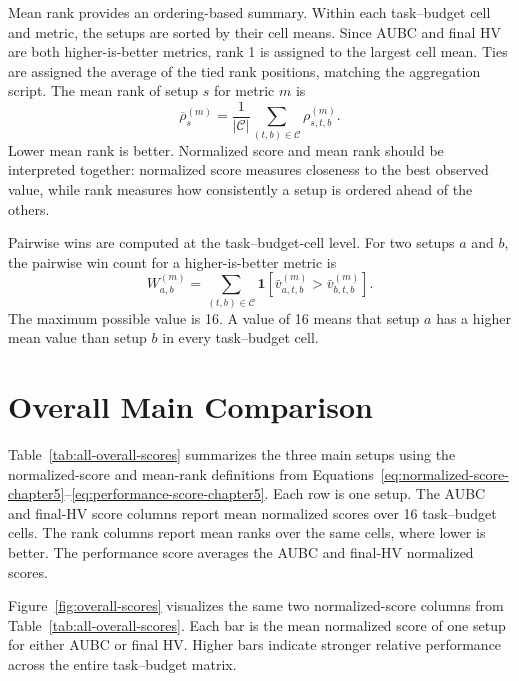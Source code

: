 Mean rank provides an ordering-based summary. Within each task--budget cell and metric, the setups are sorted by their cell means. Since AUBC and final HV are both higher-is-better metrics, rank 1 is assigned to the largest cell mean. Ties are assigned the average of the tied rank positions, matching the aggregation script. The mean rank of setup $s$ for metric $m$ is
\begin{equation}
  \overline{\rho}^{(m)}_{s}
  =
  \frac{1}{|\mathcal{C}|}
  \sum_{(t,b)\in\mathcal{C}}
  \rho^{(m)}_{s,t,b}.
  \label{eq:mean-rank-chapter5}
\end{equation}
Lower mean rank is better. Normalized score and mean rank should be interpreted together: normalized score measures closeness to the best observed value, while rank measures how consistently a setup is ordered ahead of the others.

Pairwise wins are computed at the task--budget-cell level. For two setups $a$ and $b$, the pairwise win count for a higher-is-better metric is
\begin{equation}
  W^{(m)}_{a,b}
  =
  \sum_{(t,b)\in\mathcal{C}}
  \mathbf{1}
  \left[
    \bar{v}^{(m)}_{a,t,b}
    >
    \bar{v}^{(m)}_{b,t,b}
  \right].
  \label{eq:pairwise-wins-chapter5}
\end{equation}
The maximum possible value is 16. A value of 16 means that setup $a$ has a higher mean value than setup $b$ in every task--budget cell.

\section{Overall Main Comparison}

Table~\ref{tab:all-overall-scores} summarizes the three main setups using the normalized-score and mean-rank definitions from Equations~\ref{eq:normalized-score-chapter5}--\ref{eq:performance-score-chapter5}. Each row is one setup. The AUBC and final-HV score columns report mean normalized scores over 16 task--budget cells. The rank columns report mean ranks over the same cells, where lower is better. The performance score averages the AUBC and final-HV normalized scores.



Figure~\ref{fig:overall-scores} visualizes the same two normalized-score columns from Table~\ref{tab:all-overall-scores}. Each bar is the mean normalized score of one setup for either AUBC or final HV. Higher bars indicate stronger relative performance across the entire task--budget matrix.

